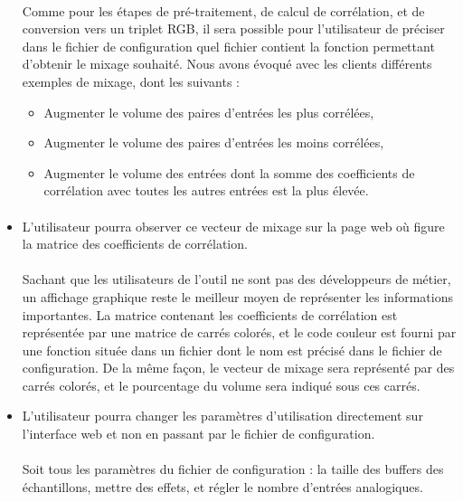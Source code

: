 \documentclass{article}
\begin{document}
\begin{itemize}
       \paragraph{}
       Comme pour les étapes de pré-traitement, de calcul de corrélation, et de
       conversion vers un triplet RGB, il sera possible pour l'utilisateur de
       préciser dans le fichier de configuration quel fichier contient la
       fonction permettant d'obtenir le mixage souhaité. Nous avons évoqué avec
       les clients différents exemples de mixage, dont les suivants :
       \begin{itemize}
        \item Augmenter le volume des paires d'entrées les plus corrélées,
        \item Augmenter le volume des paires d'entrées les moins corrélées,
        \item Augmenter le volume des entrées dont la somme des coefficients de
              corrélation avec toutes les autres entrées est la plus élevée.
       \end{itemize}
       \paragraph{}
       
 \item L'utilisateur pourra observer ce vecteur de mixage sur la page
       web où figure la matrice des coefficients de corrélation.
       \paragraph{}
       Sachant que les utilisateurs de l'outil ne sont pas des développeurs de
       métier, un affichage graphique reste le meilleur moyen de représenter les
       informations importantes. La matrice contenant les coefficients de
       corrélation est représentée par une matrice de carrés colorés, et le
       code couleur est fourni par une fonction située dans un fichier dont le
       nom est précisé dans le fichier de configuration. De la même façon, le
       vecteur de mixage sera représenté par des carrés colorés, et le
       pourcentage du volume sera indiqué sous ces carrés.\\
       
 \item L'utilisateur pourra changer les paramètres d'utilisation directement sur
       l'interface web et non en passant par le fichier de configuration.
       \paragraph{}
       Soit tous les paramètres du fichier de configuration : la taille des buffers
       des échantillons, mettre des effets, et régler le nombre d'entrées analogiques.
       

\end{itemize}
\end{document}
